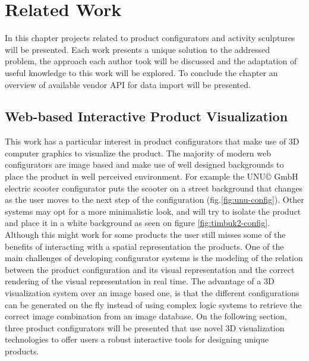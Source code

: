 \documentclass[../medieninformatik-arbeit.tex]{subfiles}
\begin{document}
	

\section{Related Work}
\label{ch:related}
In this chapter projects related to product configurators and activity
sculptures will be presented. Each work presents a unique solution to the addressed problem, 
the approach each author took will be discussed and the adaptation of useful knowledge to this
work will be explored. To conclude the chapter an overview of available vendor
API for data import will be presented. 

\subsection{Web-based Interactive Product Visualization}
This work has a particular interest in product configurators that make use of 3D
computer graphics to visualize the product. The majority of modern web
configurators are image based and make use of well designed backgrounds to place the
product in well perceived environment. For example the UNU\copyright{} GmbH electric scooter
configurator puts the scooter on a street background that
changes as the user moves to the next step of the configuration (fig.\ref{fig:unu-config}). 
Other systems may opt for a more minimalistic look, and will try to isolate the
product and place it in a white background as seen on
figure \ref{fig:timbuk2-config}. 
Although this might work for some products the user still misses some of the benefits of
interacting with a spatial representation the products\cite{vande2009analyzing}.
One of the main challenges of developing  configurator systems is the modeling
of the relation between the product configuration and its visual representation
and the correct rendering of the visual representation in real
time\cite{feliceinteractive}. The advantage of a 3D visualization system
over an image based one, is that the different configurations can be generated on
the fly instead of using complex logic systems to retrieve the correct image
combination from an image database. On the following section, three product
configurators will be presented that use novel 3D visualization technologies to
offer users a robust interactive tools for designing unique products.
\end{document}
